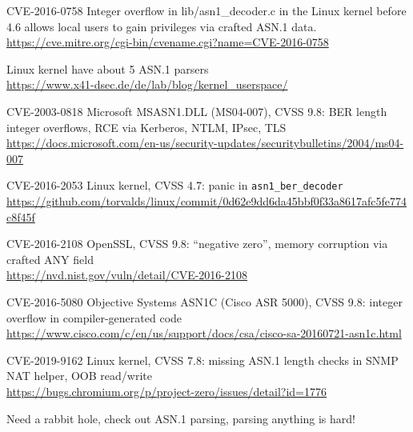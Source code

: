 \documentclass[Screen16to9,17pt]{foils}
\begin{document}

\begin{list2}
\item CVE-2016-0758 Integer overflow in lib/asn1\_decoder.c in the Linux kernel before 4.6 allows local users to gain privileges via crafted ASN.1 data.\\
\url{https://cve.mitre.org/cgi-bin/cvename.cgi?name=CVE-2016-0758}
\item Linux kernel have about 5 ASN.1 parsers\\
\url{https://www.x41-dsec.de/de/lab/blog/kernel_userspace/}
\end{list2}


\begin{list2}
\item CVE-2003-0818 Microsoft MSASN1.DLL (MS04-007), CVSS 9.8:
      BER length integer overflows, RCE via Kerberos, NTLM, IPsec, TLS\\
\url{https://docs.microsoft.com/en-us/security-updates/securitybulletins/2004/ms04-007}
\item CVE-2016-2053 Linux kernel, CVSS 4.7: panic in \verb+asn1_ber_decoder+\\
\url{https://github.com/torvalds/linux/commit/0d62e9dd6da45bbf0f33a8617afc5fe774c8f45f}
\item CVE-2016-2108 OpenSSL, CVSS 9.8: ``negative zero'',
      memory corruption via crafted ANY field\\
\url{https://nvd.nist.gov/vuln/detail/CVE-2016-2108}
\item CVE-2016-5080 Objective Systems ASN1C (Cisco ASR 5000), CVSS 9.8:
      integer overflow in compiler-generated code\\
      \url{https://www.cisco.com/c/en/us/support/docs/csa/cisco-sa-20160721-asn1c.html}
\item CVE-2019-9162 Linux kernel, CVSS 7.8: missing ASN.1 length checks
      in SNMP NAT helper, OOB read/write\\
      \url{https://bugs.chromium.org/p/project-zero/issues/detail?id=1776}
\end{list2}

Need a rabbit hole, check out ASN.1 parsing, parsing anything is hard!

\end{document}
